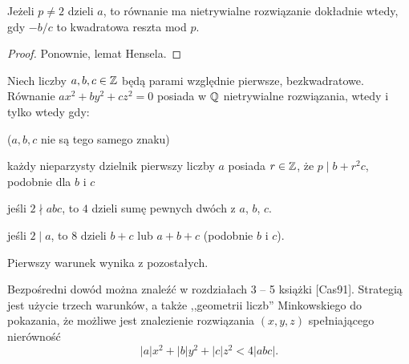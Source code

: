 \begin{lemat}
	Jeżeli  $p \neq 2$ dzieli $a$, to równanie ma nietrywialne rozwiązanie dokładnie wtedy, gdy $-b/c$ to kwadratowa reszta mod $p$.
\end{lemat}

\begin{proof}
	Ponownie, lemat Hensela.
\end{proof}

\begin{fakt}
	Niech liczby $a,b,c \in \mathbb Z$ będą parami względnie pierwsze, bezkwadratowe.
	Równanie $ax^2+by^2+cz^2 = 0$ posiada w $\mathbb Q$ nietrywialne rozwiązania, wtedy i tylko wtedy gdy:
	\begin{enumx}
		\item ($a,b,c$ nie są tego samego znaku)
		\item każdy nieparzysty dzielnik pierwszy liczby $a$ posiada $r \in \mathbb Z$, że $p \mid b+r^2c$, podobnie dla $b$ i $c$
		\item jeśli $2 \nmid abc$, to $4$ dzieli sumę pewnych dwóch z $a$, $b$, $c$.
		\item jeśli $2 \mid a$, to $8$ dzieli $b+c$ lub $a+b+c$ (podobnie $b$ i $c$).
	\end{enumx}

	Pierwszy warunek wynika z pozostałych.
\end{fakt}

Bezpośredni dowód można znaleźć w rozdziałach 3 -- 5 książki [Cas91].
Strategią jest użycie trzech warunków, a także ,,geometrii liczb'' Minkowskiego do pokazania, że możliwe jest znalezienie rozwiązania $(x, y, z)$ spełniającego nierówność
\[
	|a| x^2 + |b| y^2 + |c| z^2 < 4 |abc|.
\]
